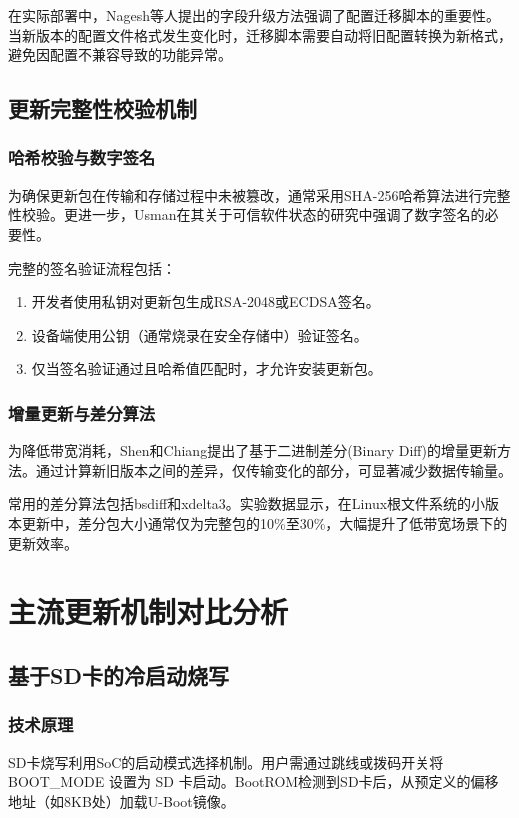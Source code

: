\documentclass[a4paper,12pt]{article}
\begin{document}
在实际部署中，Nagesh等人提出的字段升级方法强调了配置迁移脚本的重要性\cite{Nagesh2019}。当新版本的配置文件格式发生变化时，迁移脚本需要自动将旧配置转换为新格式，避免因配置不兼容导致的功能异常。

\subsection{更新完整性校验机制}

\subsubsection{哈希校验与数字签名}
为确保更新包在传输和存储过程中未被篡改，通常采用SHA-256哈希算法进行完整性校验。更进一步，Usman在其关于可信软件状态的研究中强调了数字签名的必要性\cite{Usman2025}。

完整的签名验证流程包括：
\begin{enumerate}
    \item 开发者使用私钥对更新包生成RSA-2048或ECDSA签名。
    \item 设备端使用公钥（通常烧录在安全存储中）验证签名。
    \item 仅当签名验证通过且哈希值匹配时，才允许安装更新包。
\end{enumerate}

\subsubsection{增量更新与差分算法}
为降低带宽消耗，Shen和Chiang提出了基于二进制差分(Binary Diff)的增量更新方法\cite{Shen2007}。通过计算新旧版本之间的差异，仅传输变化的部分，可显著减少数据传输量。

常用的差分算法包括bsdiff和xdelta3。实验数据显示，在Linux根文件系统的小版本更新中，差分包大小通常仅为完整包的10\%至30\%，大幅提升了低带宽场景下的更新效率。

\newpage
\section{主流更新机制对比分析}

\subsection{基于SD卡的冷启动烧写}

\subsubsection{技术原理}
SD卡烧写利用SoC的启动模式选择机制。用户需通过跳线或拨码开关将 BOOT\_MODE 设置为 SD 卡启动。BootROM检测到SD卡后，从预定义的偏移地址（如8KB处）加载U-Boot镜像。
\end{document}

